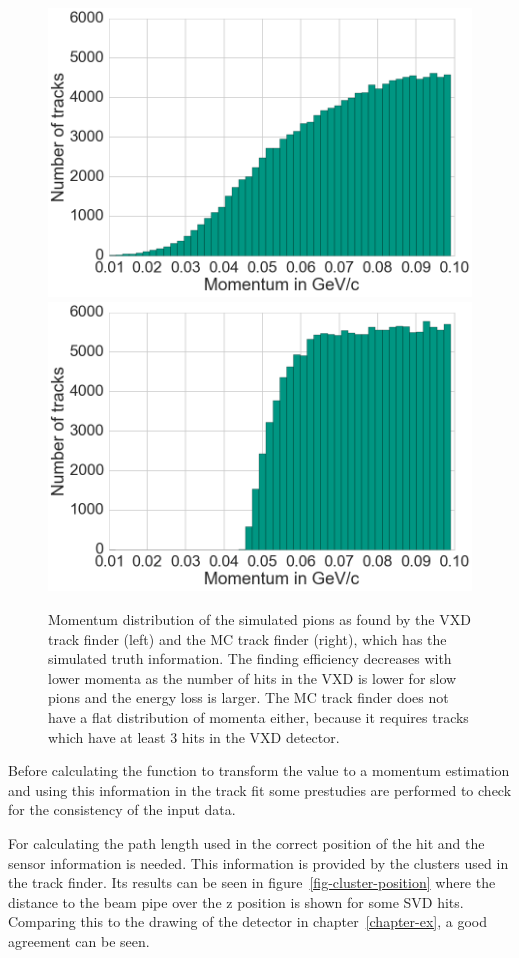 \begin{figure}
 \centering
 \includegraphics[width=0.48\linewidth]{figures/vxd/finding_efficiency.png}
 \includegraphics[width=0.48\linewidth]{figures/vxd/finding_efficiency_mc.png}
 \caption[Momentum distribution of the found and simulated pions.]{Momentum distribution of the simulated pions as found by the VXD track finder (left) and the MC track finder (right), which has the simulated truth information. The finding efficiency decreases with lower momenta as the number of hits in the VXD is lower for slow pions and the energy loss is larger. The MC track finder does not have a flat distribution of momenta either, because it requires tracks which have at least 3 hits in the VXD detector.}
 \label{fig-vxd-finding-efficiency}
\end{figure}

Before calculating the function to transform the \dedx value to a momentum estimation and using this information in the track fit some prestudies are performed to check for the consistency of the input data.

For calculating the path length used in \dedx the correct position of the hit and the sensor information is needed. This information is provided by the clusters used in the track finder. Its results can be seen in figure~\ref{fig-cluster-position} where the distance to the beam pipe over the z position is shown for some SVD hits. Comparing this to the drawing of the detector in chapter~\ref{chapter-ex}, a good agreement can be seen.

